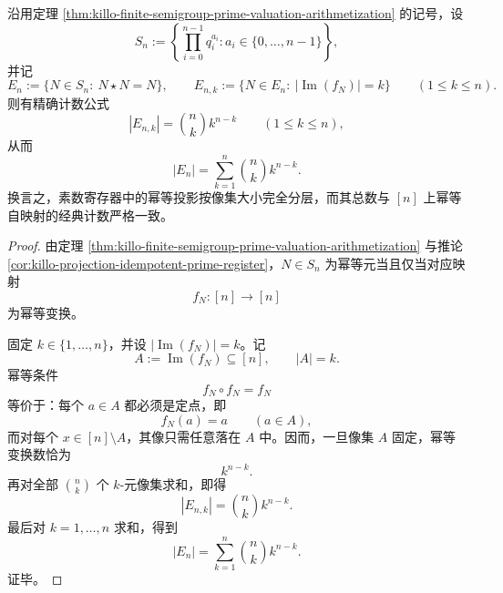 \begin{theorem}[素数寄存器半群幂等元的精确计数律]\label{thm:xi-time-part69-prime-register-idempotent-count-law}
沿用定理 \ref{thm:killo-finite-semigroup-prime-valuation-arithmetization} 的记号，设
\[
S_n:=\left\{\prod_{i=0}^{n-1}q_i^{a_i}: a_i\in\{0,\dots,n-1\}\right\},
\]
并记
\[
E_n:=\{N\in S_n:\ N\star N=N\},
\qquad
E_{n,k}:=\{N\in E_n:\ |\operatorname{Im}(f_N)|=k\}
\qquad (1\le k\le n).
\]
则有精确计数公式
\[
|E_{n,k}|=\binom{n}{k}k^{n-k}
\qquad (1\le k\le n),
\]
从而
\[
|E_n|=\sum_{k=1}^{n}\binom{n}{k}k^{n-k}.
\]
换言之，素数寄存器中的幂等投影按像集大小完全分层，而其总数与 \([n]\) 上幂等自映射的经典计数严格一致。
\end{theorem}
\begin{proof}
由定理 \ref{thm:killo-finite-semigroup-prime-valuation-arithmetization} 与推论 \ref{cor:killo-projection-idempotent-prime-register}，\(N\in S_n\) 为幂等元当且仅当对应映射
\[
f_N:[n]\to[n]
\]
为幂等变换。

固定 \(k\in\{1,\dots,n\}\)，并设 \(|\operatorname{Im}(f_N)|=k\)。记
\[
A:=\operatorname{Im}(f_N)\subseteq [n],
\qquad |A|=k.
\]
幂等条件
\[
f_N\circ f_N=f_N
\]
等价于：每个 \(a\in A\) 都必须是定点，即
\[
f_N(a)=a
\qquad (a\in A),
\]
而对每个 \(x\in[n]\setminus A\)，其像只需任意落在 \(A\) 中。因而，一旦像集 \(A\) 固定，幂等变换数恰为
\[
k^{n-k}.
\]
再对全部 \(\binom{n}{k}\) 个 \(k\)-元像集求和，即得
\[
|E_{n,k}|=\binom{n}{k}k^{n-k}.
\]
最后对 \(k=1,\dots,n\) 求和，得到
\[
|E_n|=\sum_{k=1}^{n}\binom{n}{k}k^{n-k}.
\]
证毕。
\end{proof}


